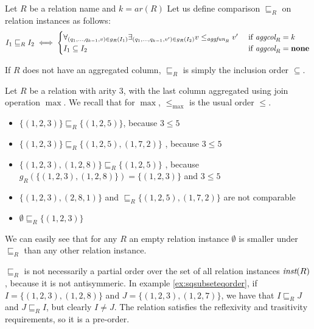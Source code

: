 \begin{defn}
Let $R$ be a relation name and $k=ar(R)$ Let us define comparison $\sqsubseteq_R$ on relation instances as follows:
$$
I_1 \sqsubseteq_R I_2 \iff
\begin{cases}
   \forall_{(q_1, ..., q_{k-1}, v) \in g_R(I_1)} \exists_{(q_1, ..., q_{k-1}, v') \in g_R(I_2)} v \le_{\textit{aggfun}_R} v' & \text{ if } \textit{aggcol}_R = k \\
   I_1 \subseteq I_2 & \text{ if } \textit{aggcol}_R = \bf{none} 
\end{cases}
$$
\end{defn}

\begin{rem}
If $R$ does not have an aggregated column, $\sqsubseteq_R$ is simply the inclusion order $\subseteq$. 
\end{rem}


\begin{exmp}
Let $R$ be a relation with arity $3$, with the last column aggregated using join operation $\max$.
We recall that for $ \max $, $ \le_{\max} $ is the usual order $ \le $.
\begin{itemize}
\item $\{(1, 2, 3)\} \sqsubseteq_R \{(1, 2, 5)\}$, because $3 \le 5$
\item $\{(1, 2, 3)\} \sqsubseteq_R \{(1, 2, 5), (1, 7, 2)\}$ , because $3 \le 5$
\item $\{(1, 2, 3), (1, 2, 8)\} \sqsubseteq_R \{(1, 2, 5)\}$ , because $g_R(\{(1, 2, 3), (1, 2, 8)\}) = \{(1,2,3)\}$ and $3 \le 5$
\item $\{(1, 2, 3), (2, 8, 1)\}$ and  $\sqsubseteq_R \{(1, 2, 5), (1, 7, 2)\}$ are not comparable
\item $\emptyset \sqsubseteq_R \{(1, 2, 3)\}$
\end{itemize}
\end{exmp}\label{ex:sqsubseteqorder}

We can easily see that for any $R$ an empty relation instance $\emptyset$ is smaller under $\sqsubseteq_R$  than any other relation instance.


$\sqsubseteq_R$ is not necessarily a partial order over the set of all relation instances $\textit{inst}(R)$, because it is not antisymmeric. In example \ref{ex:sqsubseteqorder}, if $I = \{(1, 2, 3), (1, 2, 8)\}$ and $J = \{(1, 2, 3), (1, 2, 7)\}$, we have that $I \sqsubseteq_R J$ and $J \sqsubseteq_R I$, but clearly $I \ne J$. The relation satisfies the reflexivity and trasitivity requirements, so it is a pre-order.

